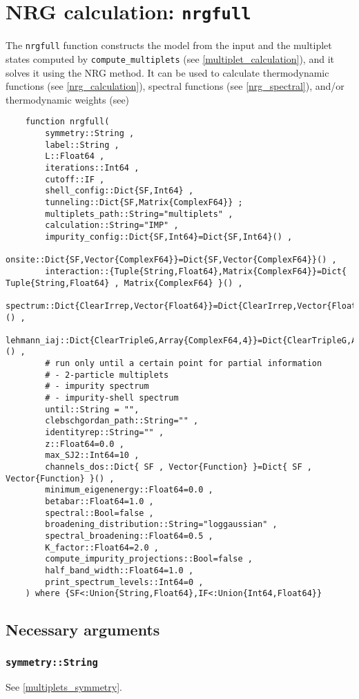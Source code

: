 \documentclass[notitlepage]{article}
\begin{document}
\section{NRG calculation: \texttt{nrgfull}}\label{nrg}
The \texttt{nrgfull} function constructs the model from the
input and the multiplet states computed by
\texttt{compute\_multiplets} (see
\ref{multiplet_calculation}), and it solves it using the NRG
method. It can be used to calculate thermodynamic functions
(see \ref{nrg_calculation}), spectral functions (see
\ref{nrg_spectral}), and/or thermodynamic weights (see)

\begin{verbatim}
    function nrgfull(
        symmetry::String ,
        label::String ,
        L::Float64 ,
        iterations::Int64 ,
        cutoff::IF ,
        shell_config::Dict{SF,Int64} ,
        tunneling::Dict{SF,Matrix{ComplexF64}} ;
        multiplets_path::String="multiplets" ,
        calculation::String="IMP" ,
        impurity_config::Dict{SF,Int64}=Dict{SF,Int64}() ,
        onsite::Dict{SF,Vector{ComplexF64}}=Dict{SF,Vector{ComplexF64}}() ,
        interaction::{Tuple{String,Float64},Matrix{ComplexF64}}=Dict{ Tuple{String,Float64} , Matrix{ComplexF64} }() ,
        spectrum::Dict{ClearIrrep,Vector{Float64}}=Dict{ClearIrrep,Vector{Float64}}() ,
        lehmann_iaj::Dict{ClearTripleG,Array{ComplexF64,4}}=Dict{ClearTripleG,Array{ComplexF64,4}}() ,
        # run only until a certain point for partial information
        # - 2-particle multiplets
        # - impurity spectrum
        # - impurity-shell spectrum
        until::String = "",
        clebschgordan_path::String="" ,
        identityrep::String="" ,
        z::Float64=0.0 ,
        max_SJ2::Int64=10 ,
        channels_dos::Dict{ SF , Vector{Function} }=Dict{ SF , Vector{Function} }() ,
        minimum_eigenenergy::Float64=0.0 ,
        betabar::Float64=1.0 ,
        spectral::Bool=false ,
        broadening_distribution::String="loggaussian" ,
        spectral_broadening::Float64=0.5 ,
        K_factor::Float64=2.0 ,
        compute_impurity_projections::Bool=false ,
        half_band_width::Float64=1.0 ,
        print_spectrum_levels::Int64=0 ,
    ) where {SF<:Union{String,Float64},IF<:Union{Int64,Float64}}
\end{verbatim}

\subsection{Necessary arguments}
\subsubsection{\texttt{symmetry::String}}
\label{nrg_symmetry}
See \ref{multiplets_symmetry}.
\end{document}
